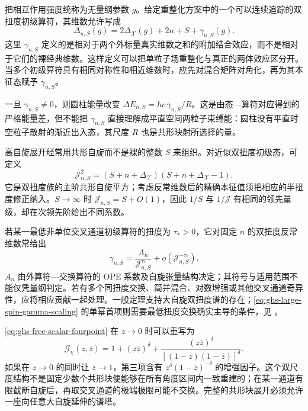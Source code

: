 把相互作用强度统称为无量纲参数 $g$。给定重整化方案中的一个可以连续追踪的双扭度初级算符，其维数允许写成
\begin{equation}\label{eq:ghs-doubletwist-anomalous-dimension}
 \Delta_{n,S}(g)=2\Delta_\mathcal X(g)+2n+S+\gamma_{n,S}(g).
\end{equation}
这里 $\gamma_{n,S}$ 定义的是相对于两个外标量真实维数之和的附加结合效应，而不是相对于它们的裸经典维数。这样定义可以把单粒子场重整化与真正的两体效应区分开。当多个初级算符具有相同对称性和相近维数时，应先对混合矩阵对角化，再为其本征态赋予 $\gamma_{n,S}$。

一旦 $\gamma_{n,S}\neq0$，则圆柱能量改变 $\Delta E_{n,S}=\hbar c\,\gamma_{n,S}/R$。这是由态—算符对应得到的严格能量差，但不能把 $\gamma_{n,S}$ 直接理解成平直空间两粒子束缚能：圆柱没有平直时空粒子散射的渐近出入态，其尺度 $R$ 也是共形映射所选择的量。


高自旋展开经常用共形自旋而不是裸的整数 $S$ 来组织。对近似双扭度初级态，可定义
\begin{equation}\label{eq:ghs-conformal-spin}
 \mathcal J_{n,S}^2
 =\left(S+n+\Delta_\mathcal X\right)
 \left(S+n+\Delta_\mathcal X-1\right).
\end{equation}
它是双扭度族的主阶共形自旋平方；考虑反常维数后的精确本征值须把相应的半扭度修正纳入。$S\to\infty$ 时 $\mathcal J_{n,S}=S+O(1)$，因此 $1/S$ 与 $1/\mathcal J$ 有相同的领先量级，却在次领先阶给出不同系数。

若某一最低非单位交叉通道初级算符的扭度为 $\tau_*>0$，它对固定 $n$ 的双扭度反常维数常给出
\begin{equation}\label{eq:ghs-large-spin-gamma-scaling}
 \gamma_{n,S}
 =\frac{A_n}{\mathcal J_{n,S}^{\tau_*}}
 +o\!\left(\mathcal J_{n,S}^{-\tau_*}\right).
\end{equation}
$A_n$ 由外算符—交换算符的 OPE 系数及自旋张量结构决定；其符号与适用范围不能仅凭量纲判定。若有多个同扭度交换、简并混合、对数增强或其他交叉通道奇异性，应将相应贡献一起处理。一般定理支持大自旋双扭度谱的存在；\cref{eq:ghs-large-spin-gamma-scaling} 的单幂首项则需要最低扭度交换确实主导的条件，见 \cite{ghs-komargodski,ghs-caronhuot}。


\cref{eq:ghs-free-scalar-fourpoint} 在 $z\to0$ 时可以重写为
\begin{equation}\label{eq:ghs-free-lightcone-limit}
 \mathcal G_\chi(z,\bar z)
 =1+(z\bar z)^\delta
 +\frac{(z\bar z)^\delta}{[(1-z)(1-\bar z)]^\delta}.
\end{equation}
如果在 $z\to0$ 的同时让 $\bar z\to1$，第三项含有 $z^\delta(1-\bar z)^{-\delta}$ 的增强因子。这个双尺度结构不是固定少数个共形块便能够在所有角度区间内一致重建的；在某一通道有限截断自旋后，再取交叉通道的极端极限可能不交换。完整的共形块展开必须允许一座向任意大自旋延伸的谱塔。

